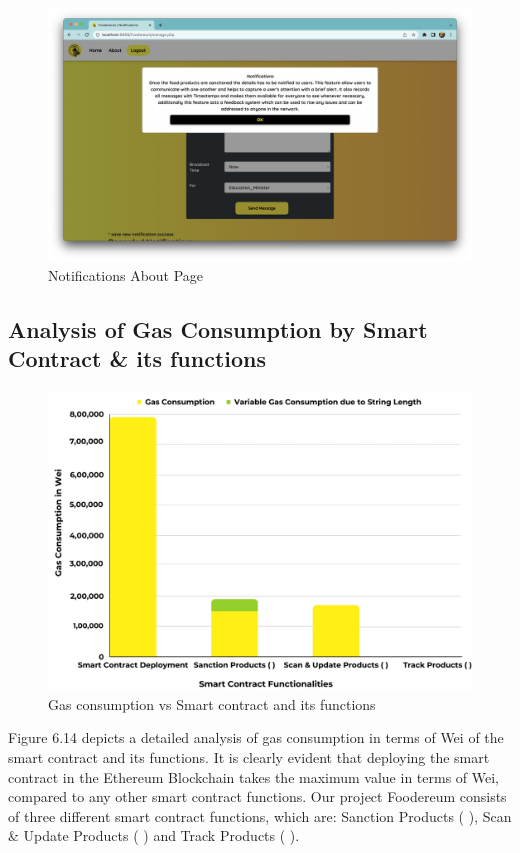 \documentclass[12pt,a4paper,twocolumn,fleqn]{article}
\begin{document}
\begin{figure} [H]
\includegraphics[width=15cm]{media/Notif_About.png}
\centering
\caption{Notifications About Page}
\end{figure}
\subsection{Analysis of Gas Consumption by Smart Contract \& its functions}
\begin{figure} [H]
\includegraphics[width=15cm]{media/Gas.png}
\centering
\caption{Gas consumption vs Smart contract and its functions}
\end{figure}
Figure 6.14 depicts a detailed analysis of gas consumption in terms of Wei of the smart contract and its functions. It is clearly evident that deploying the smart contract in the Ethereum Blockchain takes the maximum value in terms of Wei, compared to any other smart contract functions. Our project Foodereum consists of three different smart contract functions, which are: Sanction Products ( ), Scan \& Update Products ( ) and Track Products ( ). 
\end{document}
